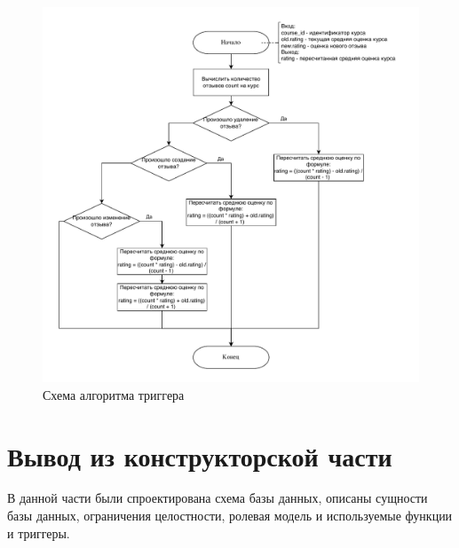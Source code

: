 \begin{figure}[H]
	\centering
	\includegraphics[height=0.7\textheight]{inc/img/trigger.pdf}
	\caption{Схема алгоритма триггера}
	\label{img:trigger}
\end{figure}

\section{Вывод из конструкторской части}

В данной части были спроектирована схема базы данных, описаны сущности базы данных, ограничения целостности, ролевая модель и используемые функции и триггеры.
